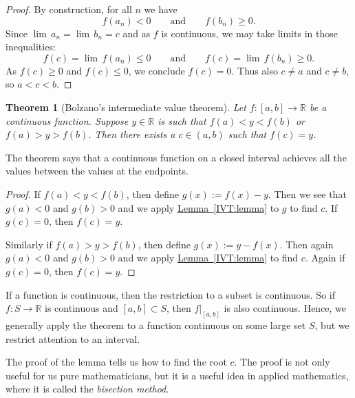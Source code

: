 \documentclass[12pt]{book}
\newcommand{\R}{{\mathbb{R}}}
\newcommand{\myindex}[1]{#1\index{#1}}
\theoremstyle{plain}
\newtheorem{thm}{Theorem}[section]
\theoremstyle{remark}
\theoremstyle{definition}
\theoremstyle{exercise}
\theoremstyle{example}
\newcommand{\lemmaref}[1]{\hyperref[#1]{Lemma~\ref*{#1}}}
\begin{document}
\begin{proof}
By construction, for all $n$ we have
\begin{equation*}
f(a_n) < 0
\qquad \text{and} \qquad
f(b_n) \geq 0 .
\end{equation*}
Since
$\lim\, a_n = \lim\, b_n = c$
and as $f$ is continuous, we may take 
limits in those inequalities:
\begin{equation*}
f(c) = \lim\, f(a_n) \leq 0
\qquad \text{and} \qquad
f(c) = \lim\, f(b_n) \geq 0 .
\end{equation*}
As $f(c) \geq 0$ and 
$f(c) \leq 0$, we conclude $f(c) = 0$.
Thus also $c \not=a$ and $c \not= b$, so
$a < c < b$.
\end{proof}

\begin{thm}[Bolzano's intermediate value theorem] \label{IVT:thm}
Let $f \colon [a,b] \to \R$ be a continuous function.
Suppose $y \in \R$ is such that $f(a) < y < f(b)$
or $f(a) > y > f(b)$.  Then there exists a $c \in (a,b)$
such that $f(c) = y$.
\end{thm}

The theorem says that a continuous function on a closed interval
achieves all the values between the values at the endpoints.

\begin{proof}
If $f(a) < y < f(b)$, then define $g(x) := f(x)-y$.  Then we see
that $g(a) < 0$ and $g(b) > 0$ and we apply \lemmaref{IVT:lemma}
to $g$ to find $c$.  If $g(c) = 0$, then $f(c) = y$.

Similarly if $f(a) > y > f(b)$, then define $g(x) := y-f(x)$.  Then
again $g(a) < 0$ and $g(b) > 0$ and we apply \lemmaref{IVT:lemma} to
find $c$.
Again if $g(c) = 0$, then $f(c) = y$.
\end{proof}

If a function is continuous, then the restriction
to a subset is continuous.  So if $f \colon S \to \R$ is continuous and
$[a,b] \subset S$, then $f|_{[a,b]}$ is also continuous.  Hence, we generally
apply the theorem to a function continuous on some large set $S$,
but we restrict attention to an interval.


The proof of the lemma tells us how to find the root $c$.  The
proof is not only useful for us pure mathematicians,
but it is a useful idea in applied mathematics,
where it is called the \emph{\myindex{bisection method}}.
\end{document}
